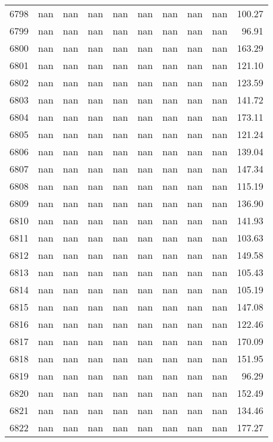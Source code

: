 \begin{tabular}{lrrrrrrrrr}
6798 & nan & nan & nan & nan & nan & nan & nan & nan & 100.27 \\
6799 & nan & nan & nan & nan & nan & nan & nan & nan & 96.91 \\
6800 & nan & nan & nan & nan & nan & nan & nan & nan & 163.29 \\
6801 & nan & nan & nan & nan & nan & nan & nan & nan & 121.10 \\
6802 & nan & nan & nan & nan & nan & nan & nan & nan & 123.59 \\
6803 & nan & nan & nan & nan & nan & nan & nan & nan & 141.72 \\
6804 & nan & nan & nan & nan & nan & nan & nan & nan & 173.11 \\
6805 & nan & nan & nan & nan & nan & nan & nan & nan & 121.24 \\
6806 & nan & nan & nan & nan & nan & nan & nan & nan & 139.04 \\
6807 & nan & nan & nan & nan & nan & nan & nan & nan & 147.34 \\
6808 & nan & nan & nan & nan & nan & nan & nan & nan & 115.19 \\
6809 & nan & nan & nan & nan & nan & nan & nan & nan & 136.90 \\
6810 & nan & nan & nan & nan & nan & nan & nan & nan & 141.93 \\
6811 & nan & nan & nan & nan & nan & nan & nan & nan & 103.63 \\
6812 & nan & nan & nan & nan & nan & nan & nan & nan & 149.58 \\
6813 & nan & nan & nan & nan & nan & nan & nan & nan & 105.43 \\
6814 & nan & nan & nan & nan & nan & nan & nan & nan & 105.19 \\
6815 & nan & nan & nan & nan & nan & nan & nan & nan & 147.08 \\
6816 & nan & nan & nan & nan & nan & nan & nan & nan & 122.46 \\
6817 & nan & nan & nan & nan & nan & nan & nan & nan & 170.09 \\
6818 & nan & nan & nan & nan & nan & nan & nan & nan & 151.95 \\
6819 & nan & nan & nan & nan & nan & nan & nan & nan & 96.29 \\
6820 & nan & nan & nan & nan & nan & nan & nan & nan & 152.49 \\
6821 & nan & nan & nan & nan & nan & nan & nan & nan & 134.46 \\
6822 & nan & nan & nan & nan & nan & nan & nan & nan & 177.27 \\

\end{tabular}
